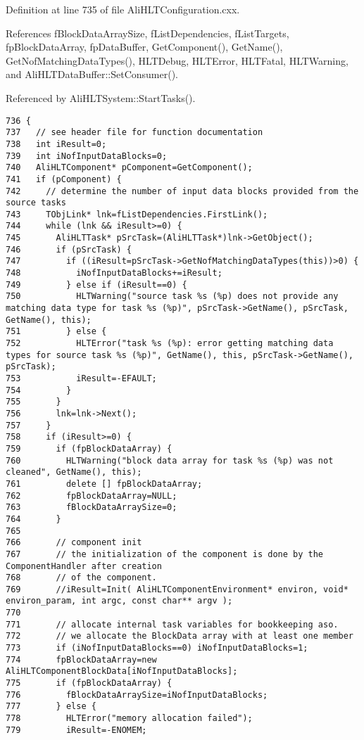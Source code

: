 Definition at line 735 of file Ali\-HLTConfiguration.cxx.

References f\-Block\-Data\-Array\-Size, f\-List\-Dependencies, f\-List\-Targets, fp\-Block\-Data\-Array, fp\-Data\-Buffer, Get\-Component(), Get\-Name(), Get\-Nof\-Matching\-Data\-Types(), HLTDebug, HLTError, HLTFatal, HLTWarning, and Ali\-HLTData\-Buffer::Set\-Consumer().

Referenced by Ali\-HLTSystem::Start\-Tasks().

\footnotesize\begin{verbatim}736 {
737   // see header file for function documentation
738   int iResult=0;
739   int iNofInputDataBlocks=0;
740   AliHLTComponent* pComponent=GetComponent();
741   if (pComponent) {
742     // determine the number of input data blocks provided from the source tasks
743     TObjLink* lnk=fListDependencies.FirstLink();
744     while (lnk && iResult>=0) {
745       AliHLTTask* pSrcTask=(AliHLTTask*)lnk->GetObject();
746       if (pSrcTask) {
747         if ((iResult=pSrcTask->GetNofMatchingDataTypes(this))>0) {
748           iNofInputDataBlocks+=iResult;
749         } else if (iResult==0) {
750           HLTWarning("source task %s (%p) does not provide any matching data type for task %s (%p)", pSrcTask->GetName(), pSrcTask, GetName(), this);
751         } else {
752           HLTError("task %s (%p): error getting matching data types for source task %s (%p)", GetName(), this, pSrcTask->GetName(), pSrcTask);
753           iResult=-EFAULT;
754         }
755       }
756       lnk=lnk->Next();
757     }
758     if (iResult>=0) {
759       if (fpBlockDataArray) {
760         HLTWarning("block data array for task %s (%p) was not cleaned", GetName(), this);
761         delete [] fpBlockDataArray;
762         fpBlockDataArray=NULL;
763         fBlockDataArraySize=0;
764       }
765 
766       // component init
767       // the initialization of the component is done by the ComponentHandler after creation
768       // of the component.
769       //iResult=Init( AliHLTComponentEnvironment* environ, void* environ_param, int argc, const char** argv );
770 
771       // allocate internal task variables for bookkeeping aso.
772       // we allocate the BlockData array with at least one member
773       if (iNofInputDataBlocks==0) iNofInputDataBlocks=1;
774       fpBlockDataArray=new AliHLTComponentBlockData[iNofInputDataBlocks];
775       if (fpBlockDataArray) {
776         fBlockDataArraySize=iNofInputDataBlocks;
777       } else {
778         HLTError("memory allocation failed");
779         iResult=-ENOMEM;

\end{verbatim}
